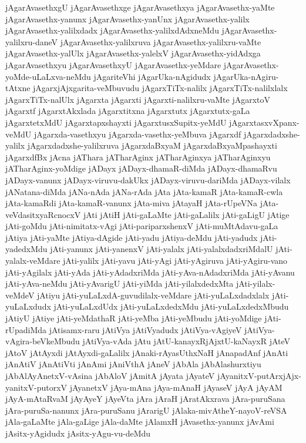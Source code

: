 {jAgarAvasethxgU
jAgarAvasethxge
jAgarAvasethxya
jAgarAvasethx-yaMte
jAgarAvasethx-yanunx
jAgarAvasethx-yanUnx
jAgarAvasethx-yalilx
jAgarAvasethx-yalilxdadx
jAgarAvasethx-yalilxdAdxneMdu
jAgarAvasethx-yalilxru-daneV
jAgarAvasethx-yalilxruva
jAgarAvasethx-yalilxru-vaMte
jAgarAvasethx-yalUlx
jAgarAvasethx-yalelxV
jAgarAvasethx-yidAdxga
jAgarAvasethxyu
jAgarAvasethxyU
jAgarAvasethx-yeMdare
jAgarAvasethx-yoMde-uLaLxva-neMdu
jAgariteVhi
jAgarUka-nAgidudx
jAgarUka-nAgiru-tAtxne
jAgarxjAjxgarita-veMbuvudu
jAgarxTiTx-nalilx
jAgarxTiTx-nalilxlalx
jAgarxTiTx-nalUlx
jAgarxta
jAgarxti
jAgarxti-nalilxru-vaMte
jAgarxtoV
jAgarxtf
jAgarxtAkxlada
jAgarxtitxna
jAgarxtutx
jAgarxtutx-gaLa
jAgarxtetxMdU
jAgarxtapxshayxti
jAgarxtusxSupitx-yeMdU
jAgarxtasxvXpanx-veMdU
jAgarxda-vasethxyu
jAgarxda-vasethx-yeMbuva
jAgarxdf
jAgarxdadxshe-yalilx
jAgarxdadxshe-yalilxruva
jAgarxdaBxyaM
jAgarxdaBxyaMpashayxti
jAgarxdfBx
jAcna
jAThara
jATharAginx
jATharAginxya
jATharAginxyu
jATharAginx-yoMdige
jADayx
jADayx-dhamaR-diMda
jADayx-dhamaRvu
jADayx-vanunx
jADayx-viruvu-dakUkx
jADayx-viruvu-dariMda
jADayx-vilalx
jANatana-diMda
jANa-nAda
jANa-rAda
jAta
jAta-kamaR
jAta-kamaR-cwla
jAta-kamaRdi
jAta-kamaR-vanunx
jAta-miva
jAtayaH
jAta-rUpeVNa
jAta-veVdasitxyaRcnocxV
jAti
jAtiH
jAti-gaLaMte
jAti-gaLalilx
jAti-gaLigU
jAtige
jAti-goMdu
jAti-nimitatx-vAgi
jAti-pariparxshenxV
jAti-muMtAdavu-gaLa
jAtiya
jAti-yaMte
jAtiya-dAgide
jAti-yadu
jAtiya-deMdu
jAti-yadudx
jAti-yadedxMdu
jAti-yanunx
jAti-yanenxV
jAti-yalalx
jAti-yalalxdadxriMdalU
jAti-yalalx-veMdare
jAti-yalilx
jAti-yavu
jAti-yAgi
jAti-yAgiruva
jAti-yAgiru-vano
jAti-yAgilalx
jAti-yAda
jAti-yAdadxriMda
jAti-yAva-nAdadxriMda
jAti-yAvanu
jAti-yAva-neMdu
jAti-yAvarigU
jAti-yiMda
jAti-yilalxdedxMta
jAti-yilalx-veMdeV
jAtiyu
jAti-yuLaLxdA-guvudilalx-veMdare
jAti-yuLaLxdadxlalx
jAti-yuLaLxdudx
jAti-yuLaLxdUdx
jAti-yuLaLxdedxMdu
jAti-yuLaLxdedxMbudu
jAtiyU
jAtiye
jAti-yeMdathaR
jAti-yeMba
jAti-yeMbudu
jAti-yoMdige
jAti-rUpadiMda
jAtisamx-raru
jAtiVya
jAtiVyadudx
jAtiVya-vAgiyeV
jAtiVya-vAgira-beVkeMbudu
jAtiVya-vAda
jAtu
jAtU-kanayxRjAjxtU-kaNayxR
jAteV
jAtoV
jAtAyxdi
jAtAyxdi-gaLalilx
jAnaki-rAyasUthxNaH
jAnapadAnf
jAnAti
jAnAtiV
jAnAtiVti
jAnAmi
jAniVthA
jAneV
jAbAla
jAbAlashurxtiyu
jAbAlAyAnetxV-vAsina
jAbAloV
jAmitA
jAyata
jAyateV
jAyanitxV-putArxjAjx-yanitxV-putorxV
jAyanetxV
jAya-mAna
jAya-mAnaH
jAyaseV
jAyA
jAyAM
jAyA-mAtaRvaM
jAyAyeY
jAyeVta
jAra
jAraH
jAratAkxrava
jAra-puruSana
jAra-puruSa-nanunx
jAra-puruSanu
jArarigU
jAlaka-mivAtheY-nayoV-reVSA
jAla-gaLaMte
jAla-gaLige
jAla-daMte
jAlamxH
jAvasethx-yanunx
jAvAmi
jAsitx-yAgidudx
jAsitx-yAgu-vu-deMdu
}
